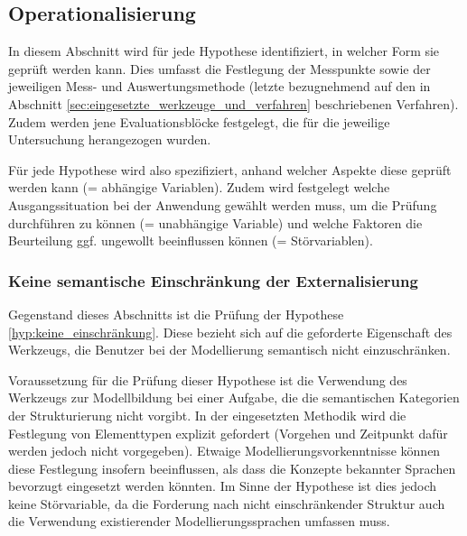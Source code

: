 \subsection{Operationalisierung} %
\label{sub:m_operationalisierung}

In diesem Abschnitt wird für jede Hypothese identifiziert, in welcher Form sie geprüft werden kann. Dies umfasst die Festlegung der Messpunkte sowie der jeweiligen Mess- und Auswertungsmethode (letzte bezugnehmend auf den in Abschnitt \ref{sec:eingesetzte_werkzeuge_und_verfahren} beschriebenen Verfahren). Zudem werden jene Evaluationsblöcke festgelegt, die für die jeweilige Untersuchung herangezogen wurden.

Für jede Hypothese wird also spezifiziert, anhand welcher Aspekte diese geprüft werden kann (= abhängige Variablen). Zudem wird festgelegt welche Ausgangssituation bei der Anwendung gewählt werden muss, um die Prüfung durchführen zu können (= unabhängige Variable) und welche Faktoren die Beurteilung ggf. ungewollt beeinflussen können (= Störvariablen).

\subsubsection{Keine semantische Einschränkung der Externalisierung} %
\label{ssub:keine_semantische_einschränkung_der_externalisierung}

Gegenstand dieses Abschnitts ist die Prüfung der Hypothese \ref{hyp:keine_einschränkung}. Diese bezieht sich auf die geforderte Eigenschaft des Werkzeugs, die Benutzer bei der Modellierung semantisch nicht einzuschränken.

Voraussetzung für die Prüfung dieser Hypothese ist die Verwendung des Werkzeugs zur Modellbildung bei einer Aufgabe, die die semantischen Kategorien der Strukturierung nicht vorgibt. In der eingesetzten Methodik wird die Festlegung von Elementtypen explizit gefordert (Vorgehen und Zeitpunkt dafür werden jedoch nicht vorgegeben). Etwaige Modellierungsvorkenntnisse können diese Festlegung insofern beeinflussen, als dass die Konzepte bekannter Sprachen bevorzugt eingesetzt werden könnten. Im Sinne der Hypothese ist dies jedoch keine Störvariable, da die Forderung nach nicht einschränkender Struktur auch die Verwendung existierender Modellierungssprachen umfassen muss.

